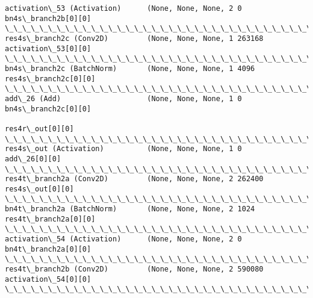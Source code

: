 \documentclass[11pt]{article}
\begin{document}
\begin{Verbatim}[commandchars=\\\{\}]
activation\_53 (Activation)      (None, None, None, 2 0           bn4s\_branch2b[0][0]              
\_\_\_\_\_\_\_\_\_\_\_\_\_\_\_\_\_\_\_\_\_\_\_\_\_\_\_\_\_\_\_\_\_\_\_\_\_\_\_\_\_\_\_\_\_\_\_\_\_\_\_\_\_\_\_\_\_\_\_\_\_\_\_\_\_\_\_\_\_\_\_\_\_\_\_\_\_\_\_\_\_\_\_\_\_\_\_\_\_\_\_\_\_\_\_\_\_\_
res4s\_branch2c (Conv2D)         (None, None, None, 1 263168      activation\_53[0][0]              
\_\_\_\_\_\_\_\_\_\_\_\_\_\_\_\_\_\_\_\_\_\_\_\_\_\_\_\_\_\_\_\_\_\_\_\_\_\_\_\_\_\_\_\_\_\_\_\_\_\_\_\_\_\_\_\_\_\_\_\_\_\_\_\_\_\_\_\_\_\_\_\_\_\_\_\_\_\_\_\_\_\_\_\_\_\_\_\_\_\_\_\_\_\_\_\_\_\_
bn4s\_branch2c (BatchNorm)       (None, None, None, 1 4096        res4s\_branch2c[0][0]             
\_\_\_\_\_\_\_\_\_\_\_\_\_\_\_\_\_\_\_\_\_\_\_\_\_\_\_\_\_\_\_\_\_\_\_\_\_\_\_\_\_\_\_\_\_\_\_\_\_\_\_\_\_\_\_\_\_\_\_\_\_\_\_\_\_\_\_\_\_\_\_\_\_\_\_\_\_\_\_\_\_\_\_\_\_\_\_\_\_\_\_\_\_\_\_\_\_\_
add\_26 (Add)                    (None, None, None, 1 0           bn4s\_branch2c[0][0]              
                                                                 res4r\_out[0][0]                  
\_\_\_\_\_\_\_\_\_\_\_\_\_\_\_\_\_\_\_\_\_\_\_\_\_\_\_\_\_\_\_\_\_\_\_\_\_\_\_\_\_\_\_\_\_\_\_\_\_\_\_\_\_\_\_\_\_\_\_\_\_\_\_\_\_\_\_\_\_\_\_\_\_\_\_\_\_\_\_\_\_\_\_\_\_\_\_\_\_\_\_\_\_\_\_\_\_\_
res4s\_out (Activation)          (None, None, None, 1 0           add\_26[0][0]                     
\_\_\_\_\_\_\_\_\_\_\_\_\_\_\_\_\_\_\_\_\_\_\_\_\_\_\_\_\_\_\_\_\_\_\_\_\_\_\_\_\_\_\_\_\_\_\_\_\_\_\_\_\_\_\_\_\_\_\_\_\_\_\_\_\_\_\_\_\_\_\_\_\_\_\_\_\_\_\_\_\_\_\_\_\_\_\_\_\_\_\_\_\_\_\_\_\_\_
res4t\_branch2a (Conv2D)         (None, None, None, 2 262400      res4s\_out[0][0]                  
\_\_\_\_\_\_\_\_\_\_\_\_\_\_\_\_\_\_\_\_\_\_\_\_\_\_\_\_\_\_\_\_\_\_\_\_\_\_\_\_\_\_\_\_\_\_\_\_\_\_\_\_\_\_\_\_\_\_\_\_\_\_\_\_\_\_\_\_\_\_\_\_\_\_\_\_\_\_\_\_\_\_\_\_\_\_\_\_\_\_\_\_\_\_\_\_\_\_
bn4t\_branch2a (BatchNorm)       (None, None, None, 2 1024        res4t\_branch2a[0][0]             
\_\_\_\_\_\_\_\_\_\_\_\_\_\_\_\_\_\_\_\_\_\_\_\_\_\_\_\_\_\_\_\_\_\_\_\_\_\_\_\_\_\_\_\_\_\_\_\_\_\_\_\_\_\_\_\_\_\_\_\_\_\_\_\_\_\_\_\_\_\_\_\_\_\_\_\_\_\_\_\_\_\_\_\_\_\_\_\_\_\_\_\_\_\_\_\_\_\_
activation\_54 (Activation)      (None, None, None, 2 0           bn4t\_branch2a[0][0]              
\_\_\_\_\_\_\_\_\_\_\_\_\_\_\_\_\_\_\_\_\_\_\_\_\_\_\_\_\_\_\_\_\_\_\_\_\_\_\_\_\_\_\_\_\_\_\_\_\_\_\_\_\_\_\_\_\_\_\_\_\_\_\_\_\_\_\_\_\_\_\_\_\_\_\_\_\_\_\_\_\_\_\_\_\_\_\_\_\_\_\_\_\_\_\_\_\_\_
res4t\_branch2b (Conv2D)         (None, None, None, 2 590080      activation\_54[0][0]              
\_\_\_\_\_\_\_\_\_\_\_\_\_\_\_\_\_\_\_\_\_\_\_\_\_\_\_\_\_\_\_\_\_\_\_\_\_\_\_\_\_\_\_\_\_\_\_\_\_\_\_\_\_\_\_\_\_\_\_\_\_\_\_\_\_\_\_\_\_\_\_\_\_\_\_\_\_\_\_\_\_\_\_\_\_\_\_\_\_\_\_\_\_\_\_\_\_\_

\end{Verbatim}
\end{document}
